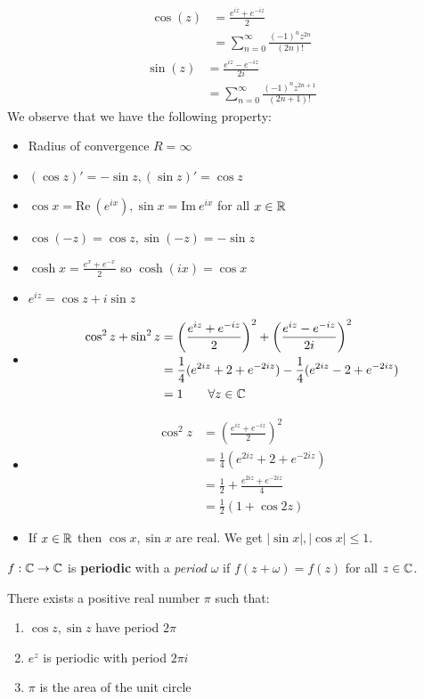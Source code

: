 \documentclass[12pt]{article}
\begin{document}
 \begin{align*}
    \cos(z) &= \frac{e^{iz}+e^{-iz}}{2}\\
    &= \sum_{n=0}^{\infty}\frac{(-1)^nz^{2n}}{(2n)!}
\end{align*}
\begin{align*}
    \sin(z) &= \frac{e^{iz}-e^{-iz}}{2i}\\
    &= \sum_{n=0}^{\infty}\frac{(-1)^nz^{2n+1}}{(2n+1)!}
\end{align*}
We observe that we have the following property:
\begin{itemize}
    \item Radius of convergence $R=\infty$
    \item $(\cos z)'=-\sin z, (\sin z)'=\cos z$
    \item $\cos x= \mathrm{Re~}(e^{ix}), \sin x = \mathrm{Im~} e^{ix}$ for all $x\in \mathbb{R}$
    \item $\cos (-z)=\cos z, \sin(-z)=-\sin z$
    \item $\cosh x = \frac{e^x+e^{-x}}{2}$ so $\cosh (ix)=\cos x$
    \item $e^{iz}=\cos z+i\sin z$
    \item \begin{align*}
        \cos^2z+\sin^2z &= \left(\frac{e^{iz}+e^{-iz}}{2}\right)^2 + \left(\frac{e^{iz}-e^{-iz}}{2i}\right)^2\\
        &= \frac{1}{4}(e^{2iz}+2+e^{-2iz})-\frac{1}{4}(e^{2iz}-2+e^{-2iz})\\
        &= 1\qquad \forall z\in \mathbb{C}
    \end{align*}
    \item \begin{align*}
        \cos^2z &= \left(\frac{e^{iz}+e^{-iz}}{2}\right)^2\\
        &= \frac{1}{4}(e^{2iz}+2+e^{-2iz})\\
        &= \frac{1}{2} + \frac{e^{2iz}+e^{-2iz}}{4}\\
        &= \frac{1}{2}(1+\cos 2z)
    \end{align*}
    \item If $x\in \mathbb{R}$ then $\cos x, \sin x$ are real. We get $|\sin x|,|\cos x|\leq 1$.
\end{itemize}

 $f:\mathbb{C}\to\mathbb{C}$ is \textbf{periodic} with a \textit{period} $\omega$ if $f(z+\omega)=f(z)$ for all $z\in \mathbb{C}$.

\begin{theorem}
    There exists a positive real number $\pi$ such that:\begin{enumerate}[label=(\alph *)]
        \item $\cos z, \sin z$ have period $2\pi$
        \item $e^z$ is periodic with period $2\pi i$
        \item $\pi$ is the area of the unit circle
    \end{enumerate}
\end{theorem}
\end{document}
